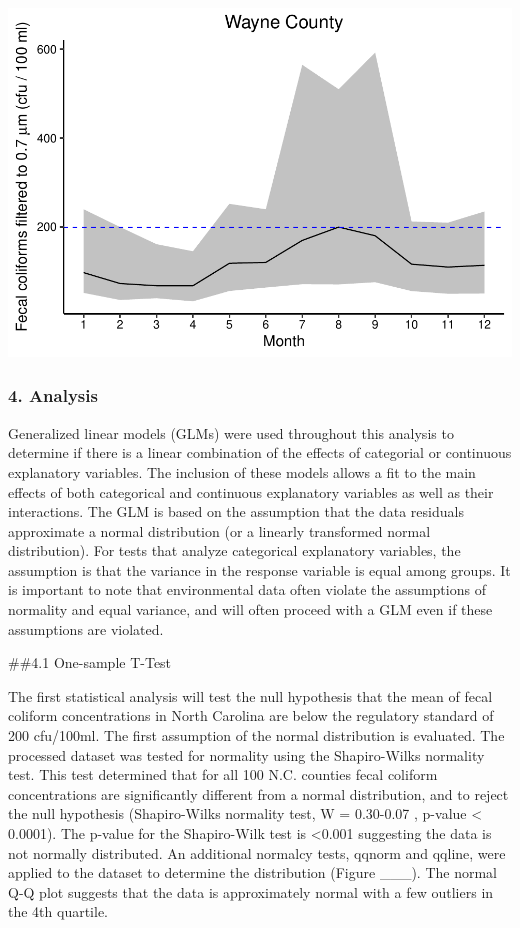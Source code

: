 \documentclass[12pt,]{article}
\begin{document}
\includegraphics{Edmondson_ENV872_Project_files/figure-latex/unnamed-chunk-24-1.pdf}
\newpage

\hypertarget{analysis}{%
\subsubsection{4. Analysis}\label{analysis}}

Generalized linear models (GLMs) were used throughout this analysis to
determine if there is a linear combination of the effects of categorial
or continuous explanatory variables. The inclusion of these models
allows a fit to the main effects of both categorical and continuous
explanatory variables as well as their interactions. The GLM is based on
the assumption that the data residuals approximate a normal distribution
(or a linearly transformed normal distribution). For tests that analyze
categorical explanatory variables, the assumption is that the variance
in the response variable is equal among groups. It is important to note
that environmental data often violate the assumptions of normality and
equal variance, and will often proceed with a GLM even if these
assumptions are violated.

\#\#4.1 One-sample T-Test

The first statistical analysis will test the null hypothesis that the
mean of fecal coliform concentrations in North Carolina are below the
regulatory standard of 200 cfu/100ml. The first assumption of the normal
distribution is evaluated. The processed dataset was tested for
normality using the Shapiro-Wilks normality test. This test determined
that for all 100 N.C. counties fecal coliform concentrations are
significantly different from a normal distribution, and to reject the
null hypothesis (Shapiro-Wilks normality test, W = 0.30-0.07 , p-value
\textless{} 0.0001). The p-value for the Shapiro-Wilk test is
\textless{}0.001 suggesting the data is not normally distributed. An
additional normalcy tests, qqnorm and qqline, were applied to the
dataset to determine the distribution (Figure \_\_\_). The normal Q-Q
plot suggests that the data is approximately normal with a few outliers
in the 4th quartile.
\end{document}
